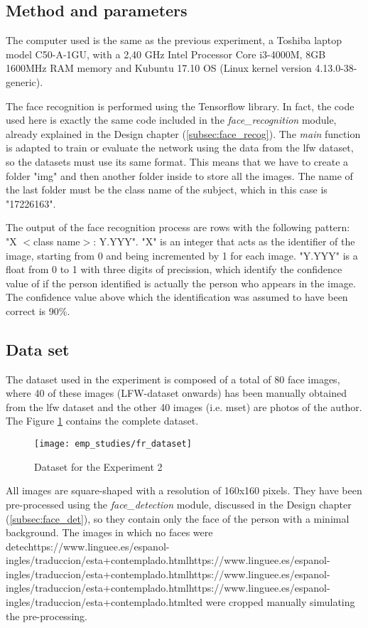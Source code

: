 	\subsection{Method and parameters}
	The computer used is the same as the previous experiment, a Toshiba laptop model C50-A-1GU, with a 2,40 GHz Intel Processor Core i3-4000M, 8GB 1600MHz RAM memory and Kubuntu 17.10 OS (Linux kernel version 4.13.0-38-generic). 

	The face recognition is performed using the Tensorflow library. In fact, the code used here is exactly the same code included in the \textit{face{\_}recognition} module, already explained in the Design chapter (\ref{subsec:face_recog}). The \textit{main} function is adapted to train or evaluate the network using the data from the \gls{lfw} dataset, so the datasets must use its same format. This means that we have to create a folder "img" and then another folder inside to store all the images. The name of the last folder must be the class name of the subject, which in this case is "17226163". 

	The output of the face recognition process are rows with the following pattern: "X $<$class name$>$: Y.YYY". "X" is an integer that acts as the identifier of the image, starting from 0 and being incremented by 1 for each image. "Y.YYY" is a float from 0 to 1 with three digits of precission, which identify the confidence value of if the person identified is actually the person who appears in the image. The confidence value above which the identification was assumed to have been correct is 90\%.

	\subsection{Data set}
	The dataset used in the experiment is composed of a total of 80 face images, where 40 of these images (LFW-dataset onwards) has been manually obtained from the \gls{lfw} dataset and the other 40 images (i.e. \gls{mset}) are photos of the author. The Figure \ref{fig:fr_dataset} contains the complete dataset. 

	\begin{figure}[!ht]
		\centering
		\texttt{[image: emp\_studies/fr\_dataset]}
		\caption{Dataset for the Experiment 2}
		\label{fig:fr_dataset}
	\end{figure}

	All images are square-shaped with a resolution of 160x160 pixels. They have been pre-processed using the \textit{face{\_}detection} module, discussed in the Design chapter (\ref{subsec:face_det}), so they contain only the face of the person with a minimal background. The images in which no faces were detechttps://www.linguee.es/espanol-ingles/traduccion/esta+contemplado.htmlhttps://www.linguee.es/espanol-ingles/traduccion/esta+contemplado.htmlhttps://www.linguee.es/espanol-ingles/traduccion/esta+contemplado.htmlhttps://www.linguee.es/espanol-ingles/traduccion/esta+contemplado.htmlted were cropped manually simulating the pre-processing.


